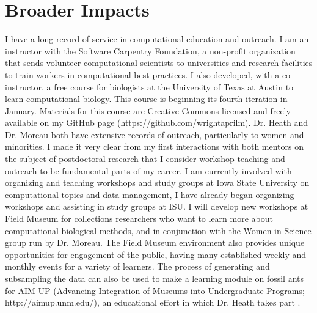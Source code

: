 \documentclass[]{article}
\begin{document}
 \section*{Broader Impacts}
 I have a long record of service in computational education and outreach. I am an instructor with the Software Carpentry Foundation, a non-profit organization that sends volunteer computational scientists to universities and research facilities to train workers in computational best practices. I also developed, with a co-instructor, a free course for biologists at the University of Texas at Austin to learn computational biology.  This course is beginning its fourth iteration in January. Materials for this course are Creative Commons licensed and freely available on my GitHub page (https://github.com/wrightaprilm). Dr. Heath and Dr. Moreau both have extensive records of outreach, particularly to women and minorities. I made it very clear from my first interactions with both mentors on the subject of postdoctoral research that I consider workshop teaching and outreach to be fundamental parts of my career. I am currently involved with organizing and teaching workshops and study groups at Iowa State University on computational topics and data management, I have already began organizing workshops and assisting in study groups at ISU. I will develop new workshops at Field Museum for collections researchers who want to learn more about computational biological methods, and in conjunction with the Women in Science group run by Dr. Moreau. The Field Museum environment also provides unique opportunities for engagement of the public, having many established weekly and monthly events for a variety of learners. The process of generating and subsampling the data can also be used to make a learning module on fossil ants for AIM-UP (Advancing Integration of Museums into Undergraduate Programs; http://aimup.unm.edu/), an educational effort in which Dr. Heath takes part \citep{Cook01082014}. \par
\end{document}
